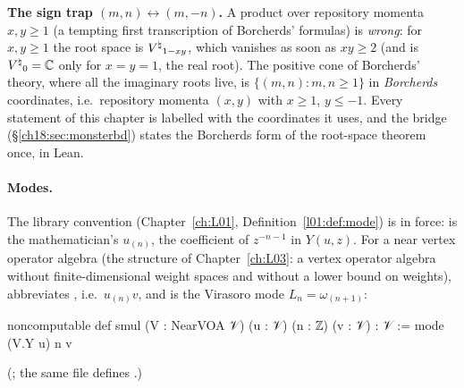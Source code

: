 \begin{warning}
\textbf{The sign trap $(m,n)\leftrightarrow(m,-n)$.}  A product over repository momenta
$x,y\ge1$ (a tempting first transcription of Borcherds' formulas) is \emph{wrong}: for $x,y\ge 1$ the root space is ${V^{\natural}}_{1-xy}$, which vanishes as soon as
$xy\ge2$ (and is ${V^{\natural}}_0=\mathbb C$ only for $x=y=1$, the real root).  The positive cone of
Borcherds' theory, where all the imaginary roots live, is $\{(m,n):m,n\ge1\}$ in \emph{Borcherds}
coordinates, i.e.\ repository momenta $(x,y)$ with $x\ge1$, $y\le-1$.  Every statement of this
chapter is labelled with the coordinates it uses, and the bridge 
(\S\ref{ch18:sec:monsterbd}) states the Borcherds form of the root-space theorem once, in Lean.
\end{warning}

\paragraph{Modes.}  The library convention  (Chapter~\ref{ch:L01},
Definition~\ref{l01:def:mode}) is in force:  is the mathematician's $u_{(n)}$, the
coefficient of $z^{-n-1}$ in $Y(u,z)$.  For a near vertex operator algebra  (the structure
 of Chapter~\ref{ch:L03}: a vertex operator algebra without finite-dimensional
weight spaces and without a lower bound on weights),  abbreviates
, i.e.\ $u_{(n)}v$, and  is the Virasoro mode
$L_n=\omega_{(n+1)}$:
\begin{leancode}
noncomputable def smul (V : NearVOA 𝒱) (u : 𝒱) (n : ℤ) (v : 𝒱) : 𝒱 := mode (V.Y u) n v
\end{leancode}
(; the same file defines .)

